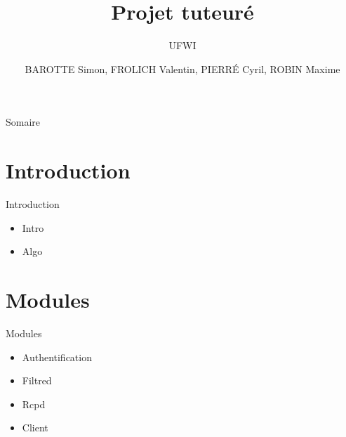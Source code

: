 \documentclass[t,12pt]{beamer}
\title{Projet tuteuré}
\subtitle{\tiny{UFWI}}
\author{BAROTTE Simon, FROLICH Valentin, PIERRÉ Cyril, ROBIN Maxime}
\begin{document}
\frame{\titlepage}


\begin{frame} 
	\begin{center}{\Large Somaire }\end{center}
	\tableofcontents[currentsection]       %
\end{frame} 

\section{Introduction}                                                    %
\begin{frame}                                                         %
    \begin{center}{\textcolor{grisbleu}{\Large Introduction}}\end{center} %
    \begin{itemize}                                                   %
	\item Intro
	\item Algo
\end{itemize}
\end{frame}                                                            %

\section{Modules}                                                    %
\begin{frame}                                                         %
    \begin{center}{\textcolor{grisbleu}{\Large Modules}}\end{center} %
    \begin{itemize}                                                   %
	\item Authentification
	\newline
	\item Filtred
	\newline
	\item Rcpd
	\newline
	\item Client
\end{itemize}
\end{frame}                                                           %
\end{document}
